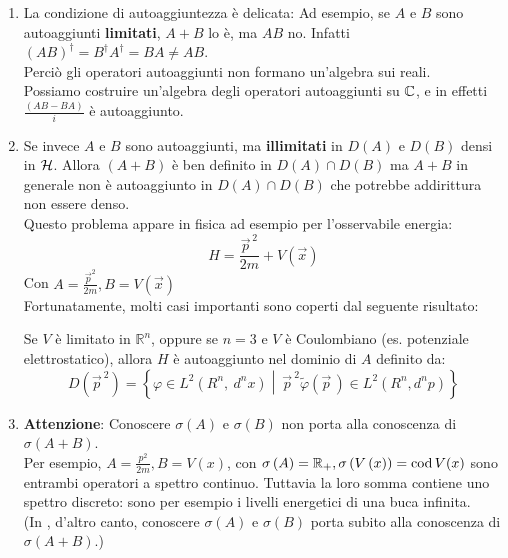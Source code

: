 \documentclass[../../FisicaTeorica.tex]{subfiles}
\begin{document}
\begin{enumerate}
    \item La condizione di autoaggiuntezza è delicata: 
	Ad esempio, se $A$ e $B$ sono autoaggiunti \textbf{limitati}, $A+B$ lo è, ma $AB$ no. Infatti $\left(AB\right)^\dag=B^\dag A^\dag=BA\neq AB$.\\
	Perciò gli operatori autoaggiunti non formano un'algebra sui reali.\\
	Possiamo costruire un'algebra degli operatori autoaggiunti su $\mathbb{C}$, e in effetti $\frac{\left(AB-BA\right)}{i}$ è autoaggiunto.
	\item Se invece $A$ e $B$ sono autoaggiunti, ma \textbf{illimitati} in $D\left(A\right)$ e $D(B)$ densi in $\mathcal{H}$. Allora $(A+B)$ è ben definito in $D\left(A\right)\cap D\left(B\right)$ ma $A+B$ in generale non è autoaggiunto in $D\left(A\right)\cap D\left(B\right)$ che potrebbe addirittura non essere denso.\\
	Questo problema appare in fisica ad esempio per l'osservabile energia:
	\[
	H=\frac{{\vec{p}}^{\,2}}{2m}+V(\vec{x})
	\]
	Con $A=\frac{{\vec{p}}^2}{2m}, B=V(\vec{x})$\\
	Fortunatamente, molti casi importanti sono coperti dal seguente risultato:
	\begin{thm}
	Se $V$ è limitato in $\mathbb{R}^n$, oppure se $n=3$ e $V$ è Coulombiano (es. potenziale elettrostatico), allora $H$ è autoaggiunto nel dominio di $A$ definito da: 
	    \[
	    D\left(\vec{p}^{\>2}\right)=\left\{\varphi\in L^2\left(R^n,\ d^nx\right)\middle|\ {\vec{p}}^{\>2}\widetilde{\varphi}\left(\vec{p}\,\right)\in L^2\left(R^n, d^np\right)\right\}
	    \]
	\end{thm}
	\item \textbf{Attenzione}: Conoscere $\sigma(A)$ e $\sigma(B)$ non porta alla conoscenza di $\sigma(A+B)$.\\
	Per esempio, $A=\frac{p^2}{2m}, B=V\left(x\right)$, con $\sigma \left(A\right)= \mathbb{R}_+, \sigma \left(V\left(x\right)\right)=\operatorname{cod} V(x)$ sono entrambi operatori a spettro continuo. Tuttavia la loro somma contiene uno spettro discreto: sono per esempio i livelli energetici di una buca infinita.\\
	(In \MC, d'altro canto, conoscere $\sigma(A)$ e $\sigma(B)$ porta subito alla conoscenza di $\sigma(A+B)$.)\\
\end{enumerate}
\end{document}
